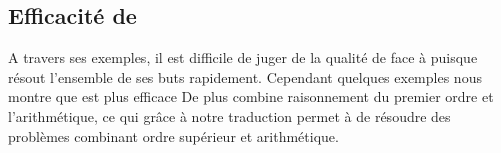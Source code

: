 \subsection{Efficacité de \beagle}
A travers ses exemples, il est difficile de juger de la qualité de \beagle
face à \metis puisque \metis résout l'ensemble de ses buts 
rapidement.
Cependant quelques exemples nous montre que \beagle est plus efficace 
De plus \beagle combine raisonnement du premier ordre et l'arithmétique, ce qui grâce à notre traduction permet à \beagletac de résoudre des problèmes combinant ordre supérieur et arithmétique.

